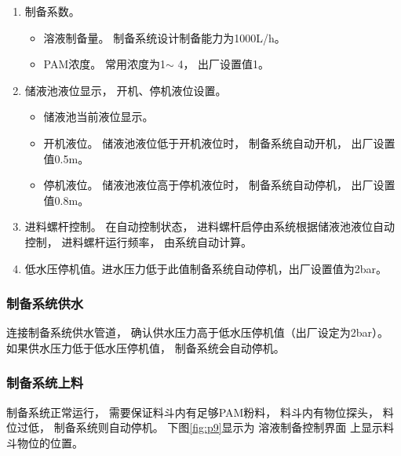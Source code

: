 \documentclass[UTF8,a4paper,12pt,titlepage]{ctexart}
\begin{document}
\begin{enumerate}
\begin{itemize}
                    “过低”红灯亮。
                    在自动控制状态，
                    料斗物位过低时，
                    溶液制备过程会自动停止，
                    电动进水阀会自动关闭，
                    螺旋进料器会自动停机。
            \end{itemize}
         \item 制备系数。
            \begin{itemize}
               \item 溶液制备量。
               制备系统设计制备能力为1000L/h。
               \item PAM浓度。
               常用浓度为1\textperthousand $\sim$ 4\textperthousand，
               出厂设置值1\textperthousand。
            \end{itemize}
         \item 储液池液位显示，
            开机、停机液位设置。
            \begin{itemize}
               \item 储液池当前液位显示。
               \item 开机液位。
                  储液池液位低于开机液位时，
                  制备系统自动开机，
                  出厂设置值0.5m。
               \item 停机液位。
                  储液池液位高于停机液位时，
                  制备系统自动停机，
                  出厂设置值0.8m。
            \end{itemize}
         \item 进料螺杆控制。
            在自动控制状态，
            进料螺杆启停由系统根据储液池液位自动控制，
            进料螺杆运行频率，
            由系统自动计算。
         \item 低水压停机值。进水压力低于此值制备系统自动停机，出厂设置值为2bar。
      \end{enumerate}

      \subsubsection{制备系统供水}\label{sec:sg4}
         连接制备系统供水管道，
         确认供水压力高于低水压停机值（出厂设定为2bar）。
         如果供水压力低于低水压停机值，
         制备系统会自动停机。

      \subsubsection{制备系统上料}
         制备系统正常运行，
         需要保证料斗内有足够PAM粉料，
         料斗内有物位探头，
         料位过低，
         制备系统则自动停机。
         下图\ref{fig:p9}显示为
         溶液制备控制界面
         上显示料斗物位的位置。
\end{document}
